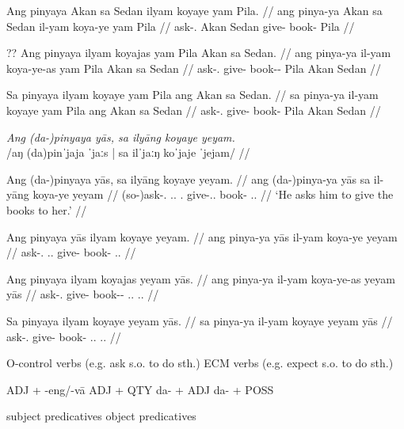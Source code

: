 \documentclass[12pt,a4paper]{scrartcl}
\newcommand{\PatTI}{{\PatT}.{\Inan}}
\newcommand{\TsgM}{{\Tsg}.{\M}}
\newcommand{\TsgF}{{\Tsg}.{\F}}
\begin{document}
\a\begingl
\gla Ang pinyaya Akan sa Sedan ilyam koyaye yam Pila. //
\glb ang pinya-ya Akan sa Sedan il-yam koya-ye yam Pila //
\glc \AgtT{} ask-\TsgM{} Akan \Parg{} Sedan give-\Ptcp{} book-\Pl{} \Dat{} Pila //
\endgl

\a\ljudge??\begingl
\gla Ang pinyaya ilyam koyajas yam Pila Akan sa Sedan. //
\glb ang pinya-ya il-yam koya-ye-as yam Pila Akan sa Sedan //
\glc \AgtT{} ask-\TsgM{} give-\Ptcp{} book-\Pl{}-\Parg{} \Dat{} Pila Akan \Parg{} Sedan //
\endgl

\a\ljudge*\begingl
\gla Sa pinyaya ilyam koyaye yam Pila ang Akan sa Sedan. //
\glb sa pinya-ya il-yam koyaye yam Pila ang Akan sa Sedan //
\glc \PatT{} ask-\TsgM{} give-\Ptcp{} book-\Pl{} \Dat{} Pila \Aarg{} Akan \Parg{} Sedan //
\endgl
\xe

\pex
\a\begingl
\glpreamble \textit{Ang (da-)pinyaya yās, sa ilyāng koyaye yeyam.} \\
	/aŋ (da)pinˈjaja ˈjaːs | sa ilˈjaːŋ koˈjaje ˈjejam/ //

\gla Ang (da-)pinyaya yās, sa ilyāng koyaye yeyam. //
\glb ang (da-)pinya-ya yās sa il-yāng koya-ye yeyam //
\glc \AgtT{} (so-)ask-\TsgM{} \TsgM{}.\Parg{} \PatTI{} give-\TsgM{}.\Aarg{} book-\Pl{} \TsgF{}.\Dat{} //
\glft `He asks him to give the books to her.' //
\endgl

\a\begingl
\gla Ang pinyaya yās ilyam koyaye yeyam. //
\glb ang pinya-ya yās il-yam koya-ye yeyam //
\glc \AgtT{} ask-\TsgM{} \TsgM{}.\Parg{} give-\Ptcp{} book-\Pl{} \TsgF{}.\Dat{} //
\endgl

\a\ljudge*\begingl
\gla Ang pinyaya ilyam koyajas yeyam yās. //
\glb ang pinya-ya il-yam koya-ye-as yeyam yās //
\glc \AgtT{} ask-\TsgM{} give-\Ptcp{} book-\Pl{}-\Parg{} \TsgF{}.\Dat{} \TsgM{}.\Parg{} //
\endgl

\a\ljudge*\begingl
\gla Sa pinyaya ilyam koyaye yeyam yās. //
\glb sa pinya-ya il-yam koyaye yeyam yās //
\glc \PatT{} ask-\TsgM{} give-\Ptcp{} book-\Pl{} \TsgF{}.\Dat{} \TsgM{}.\Parg{} //
\endgl
\xe

\ex O-control verbs (e.g. ask s.o. to do sth.) \xe
\ex ECM verbs (e.g. expect s.o. to do sth.) \xe

\ex ADJ + -eng/-vā \xe
\ex ADJ + QTY \xe
\ex da- + ADJ \xe
\ex da- + POSS \xe

\ex subject predicatives \xe
\ex object predicatives \xe

\vfill

\begin{multicols}{2}
\printglossary[style=mysuper,type=\leipzigtype]
\end{multicols}
\end{document}
